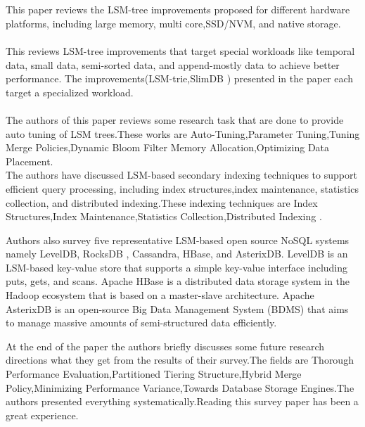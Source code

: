 \documentclass{article}
\begin{document}
\par 
\\
\\
This paper  reviews the LSM-tree improvements proposed for
different hardware platforms, including large memory, multi
core,SSD/NVM, and native storage.
\\
\\
This reviews LSM-tree improvements that
target special workloads like  temporal data, small
data, semi-sorted data, and append-mostly data to achieve better performance.
The improvements(LSM-trie,SlimDB ) presented in the paper each target a specialized workload.
\\
\\
The authors of this paper reviews some research task that are done to provide auto tuning of LSM trees.These works are Auto-Tuning,Parameter Tuning,Tuning Merge Policies,Dynamic Bloom Filter Memory Allocation,Optimizing Data Placement.
\\
The authors have discussed LSM-based secondary indexing techniques to
support efficient query processing, including index structures,index maintenance, statistics collection, and distributed indexing.These indexing  techniques are Index Structures,Index Maintenance,Statistics Collection,Distributed Indexing .
\\
\par
\newline
Authors also survey five representative LSM-based open
source NoSQL systems namely LevelDB, RocksDB ,
Cassandra, HBase, and AsterixDB.
LevelDB  is an LSM-based key-value store that  supports a simple key-value
interface including puts, gets, and scans.
Apache HBase  is a distributed data storage system in the
Hadoop ecosystem that is based on a master-slave architecture.
Apache AsterixDB is an open-source Big Data Management System (BDMS) that aims to manage massive amounts
of semi-structured data efficiently.
\\
\par
\newline

At the end of the paper the authors briefly discusses some future research directions
what they get from  the results of their survey.The fields are Thorough Performance Evaluation,Partitioned Tiering Structure,Hybrid Merge Policy,Minimizing Performance Variance,Towards Database Storage Engines.The authors presented everything systematically.Reading this survey paper has been a great experience. 
\end{document}
